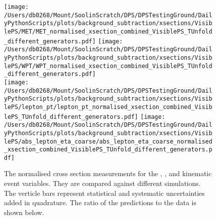 \begin{figure}[hp]
	\centering
	\texttt{[image: /Users/db0268/Mount/SoolinScratch/DPS/DPSTestingGround/DailyPythonScripts/plots/background\_subtraction/xsections/VisiblePS/MET/MET\_normalised\_xsection\_combined\_VisiblePS\_TUnfold\_different\_generators.pdf]}
	\texttt{[image: /Users/db0268/Mount/SoolinScratch/DPS/DPSTestingGround/DailyPythonScripts/plots/background\_subtraction/xsections/VisiblePS/WPT/WPT\_normalised\_xsection\_combined\_VisiblePS\_TUnfold\_different\_generators.pdf]} \\
	\texttt{[image: /Users/db0268/Mount/SoolinScratch/DPS/DPSTestingGround/DailyPythonScripts/plots/background\_subtraction/xsections/VisiblePS/lepton\_pt/lepton\_pt\_normalised\_xsection\_combined\_VisiblePS\_TUnfold\_different\_generators.pdf]} 
	\texttt{[image: /Users/db0268/Mount/SoolinScratch/DPS/DPSTestingGround/DailyPythonScripts/plots/background\_subtraction/xsections/VisiblePS/abs\_lepton\_eta\_coarse/abs\_lepton\_eta\_coarse\_normalised\_xsection\_combined\_VisiblePS\_TUnfold\_different\_generators.pdf]}
 	\caption[The normalised cross section measurements for the \ptmiss{}, \WPT{}, \LPT{} and \LETA{} kinematic event variables. They are compared against different \ttbar{} simulations. The verticle bars represent statistical and systematic uncertainties added in quadrature. The ratio of the predictions to the data is shown below.]{The normalised cross section measurements for the \ptmiss{}, \WPT{}, \LPT{} and \LETA{} kinematic event variables. They are compared against different \ttbar{} simulations. The verticle bars represent statistical and systematic uncertainties added in quadrature. The ratio of the predictions to the data is shown below.}
	\label{fig:combXSecNorm2}
\end{figure}

